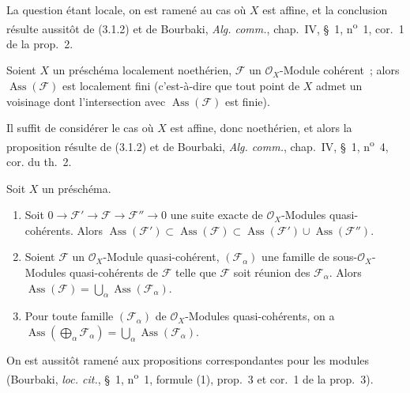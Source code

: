 La question étant locale, on est ramené au cas où $X$ est affine, et la
conclusion résulte aussitôt de (3.1.2) et de Bourbaki, \emph{Alg. comm.},
chap.~IV, \S~1, n\textsuperscript{o}~1, cor.~1 de la prop.~2.

\begin{proposition}[3.1.6]
\label{IV.2.3.1.6-fr}
Soient $X$ un préschéma localement noethérien, $\mathcal F$ un
$\mathcal O_X$-Module cohérent~; alors $\operatorname{Ass}(\mathcal F)$ est
localement fini \textup{(c'est-à-dire que tout point de $X$ admet un voisinage
dont l'intersection avec $\operatorname{Ass}(\mathcal F)$ est finie)}.
\end{proposition}

Il suffit de considérer le cas où $X$ est affine, donc noethérien, et alors la
proposition résulte de (3.1.2) et de Bourbaki, \emph{Alg. comm.}, chap.~IV,
\S~1, n\textsuperscript{o}~4, cor. du th.~2.

\begin{proposition}[3.1.7]
Soit $X$ un préschéma.
\begin{enumerate}
\item[\emph{(i)}] Soit $0\to\mathcal F'\to\mathcal F\to\mathcal F''\to0$
une suite exacte de $\mathcal O_X$-Modules quasi-cohérents. Alors
$\operatorname{Ass}(\mathcal F')\subset\operatorname{Ass}(\mathcal F)
\subset\operatorname{Ass}(\mathcal F')\cup\operatorname{Ass}(\mathcal F'')$.
\item[\emph{(ii)}] Soient $\mathcal F$ un $\mathcal O_X$-Module
quasi-cohérent, $(\mathcal F_\alpha)$ une famille de sous-$\mathcal O_X$-Modules
quasi-cohérents de $\mathcal F$ telle que $\mathcal F$ soit réunion des
$\mathcal F_\alpha$. Alors
$\operatorname{Ass}(\mathcal F)=\bigcup_\alpha\operatorname{Ass}(\mathcal F_\alpha)$.
\item[\emph{(iii)}] Pour toute famille $(\mathcal F_\alpha)$ de
$\mathcal O_X$-Modules quasi-cohérents, on a
$\operatorname{Ass}(\bigoplus_\alpha\mathcal F_\alpha)
=\bigcup_\alpha\operatorname{Ass}(\mathcal F_\alpha)$.
\end{enumerate}
\end{proposition}

On est aussitôt ramené aux propositions correspondantes pour les modules
(Bourbaki, \emph{loc. cit.}, \S~1, n\textsuperscript{o}~1, formule (1), prop.~3
et cor.~1 de la prop.~3).

